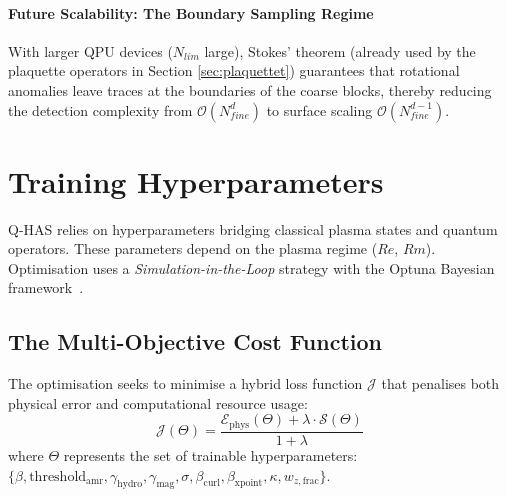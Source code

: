 \documentclass[12pt, a4paper, oneside]{report}
\begin{document}
\subsubsection{Future Scalability: The Boundary Sampling Regime}
With larger QPU devices ($N_{lim}$ large), Stokes’ theorem (already used by the plaquette operators in Section \ref{sec:plaquettet}) guarantees that rotational anomalies leave traces at the boundaries of the coarse blocks, thereby reducing the detection complexity from $\mathcal{O}(N_{fine}^d)$ to surface scaling $\mathcal{O}(N_{fine}^{d-1})$.


\chapter{Training Hyperparameters}
\label{chap:training}

Q-HAS relies on hyperparameters bridging classical plasma states and quantum operators. These parameters depend on the plasma regime ($Re$, $Rm$). Optimisation uses a \textit{Simulation-in-the-Loop} strategy with the Optuna Bayesian framework~\cite{akiba2019}.

\section{The Multi-Objective Cost Function}
The optimisation seeks to minimise a hybrid loss function $\mathcal{J}$ that penalises both physical error and computational resource usage:
\begin{equation}
    \mathcal{J}(\Theta) = \frac{\mathcal{E}_{\text{phys}}(\Theta) + \lambda \cdot \mathcal{S}(\Theta)}{1 + \lambda}
    \label{eq:combined-score}
\end{equation}
where $\Theta$ represents the set of trainable hyperparameters:\\ $\{\beta, \text{threshold}_{\text{amr}}, \gamma_{\text{hydro}}, \gamma_{\text{mag}}, \sigma, \beta_{\text{curl}}, \beta_{\text{xpoint}}, \kappa, w_{z,\text{frac}}\}$.
\end{document}

